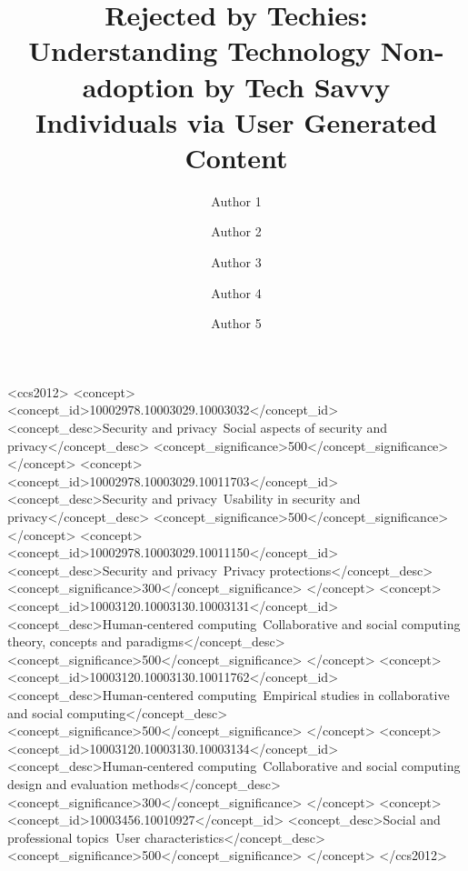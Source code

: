 \documentclass[format=acmsmall, review=false, screen=true, anonymous=true]{acmart}
\begin{document}
\title[]{Rejected by Techies: Understanding Technology Non-adoption by Tech Savvy Individuals via User Generated Content}

\author{Author 1}
\author{Author 2}
\author{Author 3}
\author{Author 4}
\author{Author 5}






\begin{CCSXML}
<ccs2012>
<concept>
<concept_id>10002978.10003029.10003032</concept_id>
<concept_desc>Security and privacy~Social aspects of security and privacy</concept_desc>
<concept_significance>500</concept_significance>
</concept>
<concept>
<concept_id>10002978.10003029.10011703</concept_id>
<concept_desc>Security and privacy~Usability in security and privacy</concept_desc>
<concept_significance>500</concept_significance>
</concept>
<concept>
<concept_id>10002978.10003029.10011150</concept_id>
<concept_desc>Security and privacy~Privacy protections</concept_desc>
<concept_significance>300</concept_significance>
</concept>
<concept>
<concept_id>10003120.10003130.10003131</concept_id>
<concept_desc>Human-centered computing~Collaborative and social computing theory, concepts and paradigms</concept_desc>
<concept_significance>500</concept_significance>
</concept>
<concept>
<concept_id>10003120.10003130.10011762</concept_id>
<concept_desc>Human-centered computing~Empirical studies in collaborative and social computing</concept_desc>
<concept_significance>500</concept_significance>
</concept>
<concept>
<concept_id>10003120.10003130.10003134</concept_id>
<concept_desc>Human-centered computing~Collaborative and social computing design and evaluation methods</concept_desc>
<concept_significance>300</concept_significance>
</concept>
<concept>
<concept_id>10003456.10010927</concept_id>
<concept_desc>Social and professional topics~User characteristics</concept_desc>
<concept_significance>500</concept_significance>
</concept>
</ccs2012>
\end{CCSXML}
\end{document}

